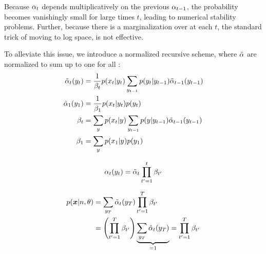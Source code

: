 Because $\alpha_{t}$ depends multiplicatively on the previous $\alpha_{t-1}$,
the probability becomes vanishingly small for large times $t$, leading to
numerical stability problems. Further, because there is a marginalization over
\states at each $t$, the standard trick of moving to log space, is not
effective.

To alleviate this issue, we introduce a normalized recursive scheme, where
$\tilde{\alpha}$ are normalized to sum up to one for all \y{}:
%
\begin{align*}
  \tilde{\alpha}_t(y_{t}) &=
    \frac{1}{\beta_t}
    p(x_{t}|y_{t})
    \sum_{y_{t-1}}
      p(y_{t} | y_{t-1})
      \tilde{\alpha}_{t-1}(y_{t-1})\\
  \tilde{\alpha}_{1}(y_{1}) &=
    \frac{1}{\beta_1}
    p(x_{t}|y_{t})
    p(y_{t})\\
  \beta_t &=
    \sum_{y_{}}
    p(x_{t}|y_{})
    \sum_{y_{t-1}}
      p(y_{} | y_{t-1})
      \tilde{\alpha}_{t-1}(y_{t-1})\\
  \beta_1 &=
    \sum_{y_{}}
    p(x_{1}|y_{})
    p(y_{1})\\
\end{align*}

\begin{equation*}
  \alpha_t(y_{t}) = \tilde{\alpha}_t \prod_{t'=1}^t \beta_{t'}
\end{equation*}

\begin{align*}
  p(\bm{x}|n,\theta)
    &= \sum_{y_{T}} \tilde{\alpha}_{t}(y_{T}) \prod_{t'=1}^T \beta_{t'}\\
    &= \left( \prod_{t'=1}^T \beta_{t'} \right)
      \underbrace{\sum_{y_{T}} \tilde{\alpha}_{t}(y_{T})}_{=1}
    = \prod_{t'=1}^T \beta_{t'}\\
\end{align*}
